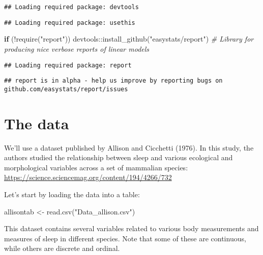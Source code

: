 \documentclass[
]{book}
\newenvironment{Shaded}{\begin{snugshade}}{\end{snugshade}}
\newcommand{\CommentTok}[1]{\textcolor[rgb]{0.56,0.35,0.01}{\textit{#1}}}
\newcommand{\ControlFlowTok}[1]{\textcolor[rgb]{0.13,0.29,0.53}{\textbf{#1}}}
\newcommand{\FunctionTok}[1]{\textcolor[rgb]{0.00,0.00,0.00}{#1}}
\newcommand{\NormalTok}[1]{#1}
\newcommand{\OtherTok}[1]{\textcolor[rgb]{0.56,0.35,0.01}{#1}}
\newcommand{\SpecialCharTok}[1]{\textcolor[rgb]{0.00,0.00,0.00}{#1}}
\newcommand{\StringTok}[1]{\textcolor[rgb]{0.31,0.60,0.02}{#1}}
\begin{document}
\begin{verbatim}
## Loading required package: devtools
\end{verbatim}

\begin{verbatim}
## Loading required package: usethis
\end{verbatim}

\begin{Shaded}
\begin{Highlighting}[]
\ControlFlowTok{if}\NormalTok{ (}\SpecialCharTok{!}\FunctionTok{require}\NormalTok{(}\StringTok{"report"}\NormalTok{)) devtools}\SpecialCharTok{::}\FunctionTok{install\_github}\NormalTok{(}\StringTok{"easystats/report"}\NormalTok{) }\CommentTok{\# Library for producing nice verbose reports of linear models}
\end{Highlighting}
\end{Shaded}

\begin{verbatim}
## Loading required package: report
\end{verbatim}

\begin{verbatim}
## report is in alpha - help us improve by reporting bugs on github.com/easystats/report/issues
\end{verbatim}

\hypertarget{the-data}{%
\section{The data}\label{the-data}}

We'll use a dataset published by Allison and Cicchetti (1976). In this study, the authors studied the relationship between sleep and various ecological and morphological variables across a set of mammalian species:
\url{https://science.sciencemag.org/content/194/4266/732}

Let's start by loading the data into a table:

\begin{Shaded}
\begin{Highlighting}[]
\NormalTok{allisontab }\OtherTok{\textless{}{-}} \FunctionTok{read.csv}\NormalTok{(}\StringTok{"Data\_allison.csv"}\NormalTok{)}
\end{Highlighting}
\end{Shaded}

This dataset contains several variables related to various body measurements and measures of sleep in different species. Note that some of these are continuous, while others are discrete and ordinal.
\end{document}
